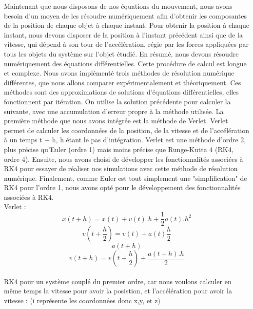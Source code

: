\documentclass[11pt]{article}
\begin{document}
Maintenant que nous disposons de nos équations du mouvement, nous avons besoin d'un moyen de les résoudre numériquement afin d'obtenir les composantes de la position de chaque objet à chaque instant. Pour obtenir la position à chaque instant, nous devons disposer de la position à l'instant précédent ainsi que de la vitesse, qui dépend à son tour de l'accélération, régie par les forces appliquées par tous les objets du système sur l'objet étudié. En résumé, nous devons résoudre numériquement des équations différentielles. Cette procédure de calcul est longue et complexe. Nous avons implémenté trois méthodes de résolution numérique différentes, que nous allons comparer expérimentalement et théoriquement. Ces méthodes sont des approximations de solutions d'équations différentielles, elles fonctionnent par itération. On utilise la solution précédente pour calculer la suivante, avec une accumulation d'erreur propre à la méthode utilisée. La première méthode que nous avons intégrée est la méthode de Verlet. Verlet permet de calculer les coordonnées de la position, de la vitesse et de l'accélération à un temps t + h, h étant le pas d'intégration. Verlet est une méthode d'ordre 2, plus précise qu'Euler (ordre 1) mais moins précise que Runge-Kutta 4 (RK4, ordre 4). Ensuite, nous avons choisi de développer les fonctionnalités associées à RK4 pour essayer de réaliser nos simulations avec cette méthode de résolution numérique. Finalement, comme Euler est tout simplement une "simplification" de RK4 pour l'ordre 1, nous avons opté pour le développement des fonctionnalités associées à RK4.
\\[2 mm]
Verlet :
\\[2 mm]
\begin{equation}
x(t+h)=x(t)+v(t).h+\frac{1}{2}{a(t)}.h^2
\end{equation}
\begin{equation}
v(t+\frac{h}{2})=v(t)+a(t)\frac{h}{2}
\end{equation}
\begin{equation}
a(t+h)
\end{equation}
\begin{equation}
v(t+h)=v(t+\frac{h}{2})+\frac{a(t+h).h}{2}
\end{equation}
\\[2 mm]
RK4 pour un système couplé du premier ordre, car nous voulons calculer en même temps la vitesse pour avoir la posistion, et l'accélération pour avoir la vitesse : (i représente les coordonnées donc x,y, et z)
\end{document}
